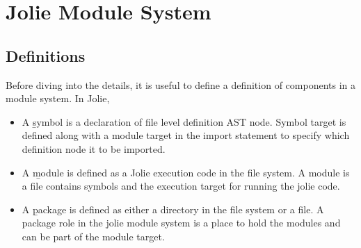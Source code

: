 \chapter{Jolie Module System}

\section{Definitions}

Before diving into the details, it is useful to define a definition of components in a module system. In Jolie,
\begin{itemize}
    \item
          A \b{symbol} is a declaration of file level definition AST node. Symbol target is defined along with a module target in the import statement to specify which definition node it to be imported.
    \item
          A \b{module} is defined as a Jolie execution code in the file system. A module is a file contains symbols and the execution target for running the jolie code.
    \item
          A \b{package} is defined as either a directory in the file system or a  file. A package role in the jolie module system is a place to hold the modules and can be part of the module target.
\end{itemize}


